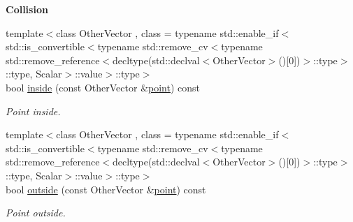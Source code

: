 \begin{Indent}{\bf Collision}\par
\begin{DoxyCompactItemize}
\item 
{\footnotesize template$<$class Other\-Vector , class  = typename std\-::enable\-\_\-if$<$std\-::is\-\_\-convertible$<$typename std\-::remove\-\_\-cv$<$typename std\-::remove\-\_\-reference$<$decltype(std\-::declval$<$\-Other\-Vector$>$()\mbox{[}0\mbox{]})$>$\-::type$>$\-::type, Scalar$>$\-::value$>$\-::type$>$ }\\bool \hyperlink{classmagrathea_1_1AbstractHyperSphere_a2fdd902b048b0192b8102fb2c2d30ad3}{inside} (const Other\-Vector \&\hyperlink{miscellaneous_8h_af4785a592bbb7b2a8882c18bb0101192}{point}) const 
\begin{DoxyCompactList}\small\item\em Point inside. \end{DoxyCompactList}\item 
{\footnotesize template$<$class Other\-Vector , class  = typename std\-::enable\-\_\-if$<$std\-::is\-\_\-convertible$<$typename std\-::remove\-\_\-cv$<$typename std\-::remove\-\_\-reference$<$decltype(std\-::declval$<$\-Other\-Vector$>$()\mbox{[}0\mbox{]})$>$\-::type$>$\-::type, Scalar$>$\-::value$>$\-::type$>$ }\\bool \hyperlink{classmagrathea_1_1AbstractHyperSphere_ac9411f645094db51b69a3f4a5be5f05a}{outside} (const Other\-Vector \&\hyperlink{miscellaneous_8h_af4785a592bbb7b2a8882c18bb0101192}{point}) const 
\begin{DoxyCompactList}\small\item\em Point outside. \end{DoxyCompactList}\end{DoxyCompactItemize}
\end{Indent}
